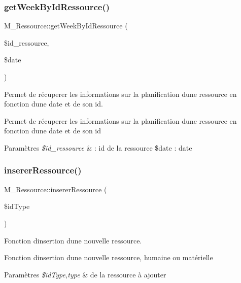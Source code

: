 \subsubsection{\texorpdfstring{get\+Week\+By\+Id\+Ressource()}{getWeekByIdRessource()}}
{\footnotesize\ttfamily M\+\_\+\+Ressource\+::get\+Week\+By\+Id\+Ressource (\begin{DoxyParamCaption}\item[{}]{\$id\+\_\+ressource,  }\item[{}]{\$date }\end{DoxyParamCaption})}



Permet de récuperer les informations sur la planification d\textquotesingle{}une ressource en fonction d\textquotesingle{}une date et de son id. 

Permet de récuperer les informations sur la planification d\textquotesingle{}une ressource en fonction d\textquotesingle{}une date et de son id 
\begin{DoxyParams}{Paramètres}
{\em \$id\+\_\+ressource} & \+: id de la ressource \$date \+: date \\
\hline
\end{DoxyParams}
\mbox{\label{class_m___ressource_a5c0662c415fe3ca04cfa4f154a668064}} 
\subsubsection{\texorpdfstring{inserer\+Ressource()}{insererRessource()}}
{\footnotesize\ttfamily M\+\_\+\+Ressource\+::inserer\+Ressource (\begin{DoxyParamCaption}\item[{}]{\$id\+Type }\end{DoxyParamCaption})}



Fonction d\textquotesingle{}insertion d\textquotesingle{}une nouvelle ressource. 

Fonction d\textquotesingle{}insertion d\textquotesingle{}une nouvelle ressource, humaine ou matérielle 
\begin{DoxyParams}{Paramètres}
{\em \$id\+Type,type} & de la ressource à ajouter \\
\hline
\end{DoxyParams}
\mbox{\label{class_m___ressource_ac7c520b36f7bfa7d4093d2ee349ff167}} 
